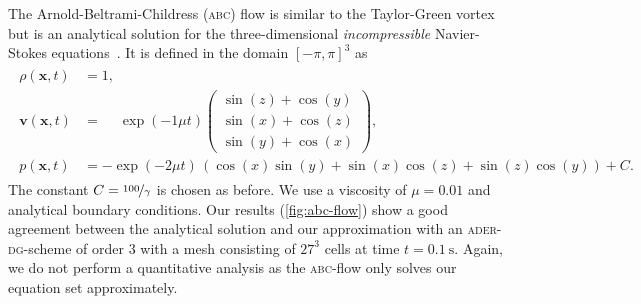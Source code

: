 \documentclass[runningheads]{llncs}
\newcommand{\aderdg}{\textsc{ader-dg}}
\newcommand{\Qrho}{\rho}
\newcommand{\Qv}{\bm{v}}
\newcommand{\pressure}{p}
\begin{document}
The Arnold-Beltrami-Childress (\textsc{abc}) flow is similar to the Taylor-Green vortex but is an analytical solution for the three-dimensional \textit{incompressible} Navier-Stokes equations~\cite{tavelli2016staggered}.
It is defined in the domain \( \left[ -\pi, \pi \right]^3 \) as
\begin{align}
  \label{eq:abc-flow}
  \begin{split}
  \Qrho(\bm{x}, t) &= 1,\\
  \Qv(\bm{x}, t) &= \phantom{-} \exp(-1\mu t)
  \begin{pmatrix}
    \sin(z) + \cos(y)\\
    \sin(x) + \cos(z)\\
    \sin(y) + \cos(x)
  \end{pmatrix}, \\
  \pressure(\bm{x}, t) &= -\exp(-2 \mu t) \, \left(\cos(x)\sin(y) + \sin(x)\cos(z) + \sin(z)\cos(y)\right)
  + C.
  \end{split}
\end{align}
The constant $C = \nicefrac{100}{\gamma}$ is chosen as before.
We use a viscosity of $\mu = 0.01$ and analytical boundary conditions.
Our results (\cref{fig:abc-flow}) show a good agreement between the analytical solution and our approximation with an \aderdg{}-scheme of order $3$ with a mesh consisting of $27^3$ cells at time $t = \SI{0.1}{\s}$.
Again, we do not perform a quantitative analysis as the \textsc{abc}-flow only solves our equation set approximately.
\end{document}
